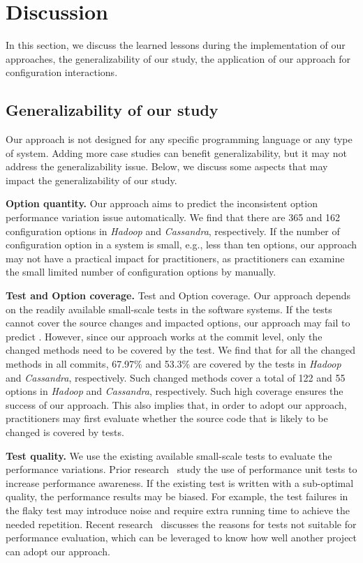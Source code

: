 \section{Discussion}
\label{discussion}
In this section, we discuss the learned lessons during the implementation of our approaches, the generalizability of our study, the application of our approach for configuration interactions.

\subsection{Generalizability of our study}

Our approach is not designed for any specific programming language or any type of system. Adding more case studies can benefit generalizability, but it may not address the generalizability issue. Below, we discuss some aspects that may impact the generalizability of our study.

\noindent \textbf{Option quantity.} Our approach aims to predict the inconsistent option performance variation issue automatically. We find that there are 365 and 162 configuration options in \emph{Hadoop} and \emph{Cassandra}, respectively. If the number of configuration option in a system is small, e.g., less than ten options, our approach may not have a practical impact for practitioners, as practitioners can examine the small limited number of configuration options by manually.

\noindent \textbf{Test and Option coverage.} Test and Option coverage. Our approach depends on the readily available small-scale tests in the software systems. If the tests cannot cover the source changes and impacted options, our approach may fail to predict \inconsistent.  However, since our approach works at the commit level, only the changed methods need to be covered by the test. We find that for all the changed methods in all commits, 67.97\% and 53.3\% are covered by the tests in \emph{Hadoop} and \emph{Cassandra}, respectively. Such changed methods cover a total of 122 and 55 options in \emph{Hadoop} and \emph{Cassandra}, respectively. Such high coverage ensures the success of our approach. This also implies that, in order to adopt our approach, practitioners may first evaluate whether the source code that is likely to be changed is covered by tests.

\noindent \textbf{Test quality.} We use the existing available small-scale tests to evaluate the performance variations. Prior  research~\cite{DBLP:conf/wosp/HorkyLMST15,ding2020towards} study the use of performance unit tests to increase performance awareness. If the existing test is written with a sub-optimal quality, the performance results may be biased. For example, the test failures in the flaky test may introduce noise and require extra running time to achieve the needed repetition. Recent research~\cite{ding2020towards} discusses the reasons for tests not suitable for performance evaluation, which can be leveraged to know how well another project can adopt our approach. 



